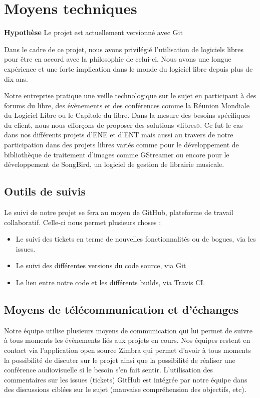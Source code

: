\section{Moyens techniques}

\begin{exemple}
\textbf{Hypothèse} Le projet \correlyce{} est actuellement versionné avec Git 
\end{exemple}

Dans le cadre de ce projet, nous avons privilégié l’utilisation de logiciels libres pour être en accord avec la philosophie de celui-ci. 
Nous avons une longue expérience et une forte implication dans le monde du logiciel libre depuis plus de dix ans.

Notre entreprise pratique une veille technologique sur le sujet en participant à des forums du libre, des évènements et des conférences comme la Réunion Mondiale du Logiciel Libre ou le Capitole du libre. \newline
Dans la mesure des besoins spécifiques du client, nous nous efforçons de proposer des solutions «libres».  Ce fut le cas dans nos différents projets d’ENE et d’ENT mais aussi au travers de notre participation dans des projets libres variés comme pour le développement de bibliothèque de traitement d’images comme GStreamer ou encore pour le développement de SongBird, un logiciel de gestion de librairie musicale. 

	\subsection{Outils de suivis}
	Le suivi de notre projet se fera au moyen de GitHub, plateforme de travail collaboratif. Celle-ci nous permet plusieurs choses : 
	
	\begin{itemize}
		\item Le suivi des tickets en terme de nouvelles fonctionnalités ou de bogues, via les issues.
		\item Le suivi des différentes versions du code source, via Git
		\item Le lien entre notre code et les différents builds, via Travis CI.
	\end{itemize}
		
	\subsection{Moyens de télécommunication et d'échanges}
	Notre équipe utilise plusieurs moyens de communication qui lui permet de suivre à tous moments les évènements liés aux projets en cours. Nos équipes restent en contact via l’application open source Zimbra qui permet d’avoir à tous moments la possibilité de discuter sur le projet ainsi que la possibilité de réaliser une conférence audiovisuelle si le besoin s’en fait sentir.
	L’utilisation des commentaires sur les issues (tickets) GitHub est intégrée par notre équipe dans des discussions ciblées sur le sujet (mauvaise compréhension des objectifs, etc).
	
